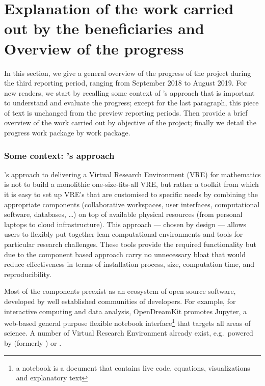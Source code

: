 \section{Explanation of the work carried out by the beneficiaries and Overview of the progress}

In this section, we give a general overview of the progress of the
project during the third reporting period, ranging from September 2018
to August 2019. For new readers, we start by recalling some context of
\ODK's approach that is important to understand and evaluate the
progress; except for the last paragraph, this piece of text is
unchanged from the preview reporting periods. Then provide a brief
overview of the work carried out by objective of the project; finally
we detail the progress work package by work package.

\subsubsection*{Some context: \ODK's approach}
\ODK's approach to delivering a Virtual Research Environment (VRE) for
mathematics is not to build a monolithic one-size-fits-all VRE, but
rather a toolkit from which it is easy to set up VRE's that are
customised to specific needs by combining the appropriate components
(collaborative workspaces, user interfaces, computational software,
databases, \dots) on top of available physical resources (from
personal laptops to cloud infrastructure). This approach --- chosen by
design --- allows users to flexibly put together lean computational
environments and tools for particular research challenges. These tools
provide the required functionality but due to the component based
approach carry no unnecessary bloat that would reduce effectiveness in
terms of installation process, size, computation time, and
reproducibility.

Most of the components preexist as an ecosystem of open source
software, developed by well established communities of developers. For
example, for interactive computing and data analysis, OpenDreamKit
promotes Jupyter, a web-based general purpose flexible notebook
interface\footnote{a notebook is a document that contains live code,
  equations, visualizations and explanatory text} that targets all
areas of science. A number of Virtual Research Environment already
exist, e.g.\ powered by \cocalc (formerly \SMC) or \JupyterHub.


